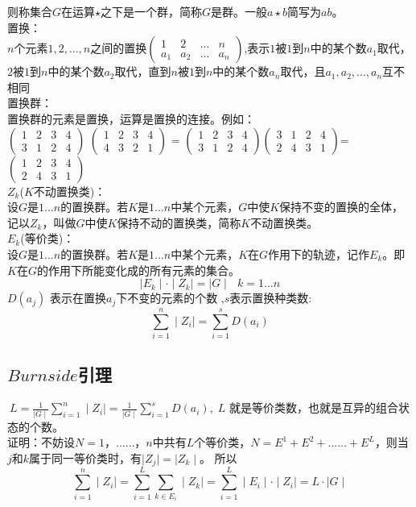 则称集合$G$在运算$\star$之下是一个群，简称$G$是群。一般$a\star b$简写为$ab$。\\
置换：\\
$n$个元素$1,2,...,n$之间的置换$\begin{pmatrix} 1 & 2 & ... & n \\ a_1 & a_2  & ... & a_n\end{pmatrix}$,表示$1$被$1$到$n$中的某个数$a_1$取代，$2$被$1$到$n$中的某个数$a_2$取代，直到$n$被$1$到$n$中的某个数$a_n$取代，且$a_1,a_2,…,a_n$互不相同 \\
置换群：\\
置换群的元素是置换，运算是置换的连接。例如： \\
$\begin{pmatrix} 1& 2 & 3 & 4 \\ 3 & 1  & 2 & 4\end{pmatrix}$ $\begin{pmatrix} 1& 2 & 3 & 4 \\ 4 & 3  & 2 & 1\end{pmatrix}$ = $\begin{pmatrix} 1& 2 & 3 & 4 \\ 3 & 1  & 2 & 4\end{pmatrix}$$\begin{pmatrix} 3& 1 & 2 & 4 \\ 2 & 4  & 3 & 1\end{pmatrix}$=$\begin{pmatrix} 1& 2 & 3 & 4 \\ 2 & 4  & 3 & 1\end{pmatrix}$ \\
$Z_k $($K$不动置换类)：\\
设$G$是$1…n$的置换群。若$K$是$1…n$中某个元素，$G$中使$K$保持不变的置换的全体，记以$Z_k$，叫做$G$中使$K$保持不动的置换类，简称$K$不动置换类。 \\
$E_k$(等价类)：\\
设$G$是$1…n$的置换群。若$K$是$1…n$中某个元素，$K$在$G$作用下的轨迹，记作$E_k$。即$K$在$G$的作用下所能变化成的所有元素的集合。 \\
$$\mid E_k\mid· \mid Z_k\mid=\mid G\mid   \ \ \  k=1…n$$
$ D(a_j)$ 表示在置换$a_j$下不变的元素的个数 ,$s$表示置换种类数: \\
$$\sum_{i=1}^{n}\mid Z_i \mid = \sum_{i=1}^{s}D(a_i)$$

\subsection{$Burnside$引理}
 $\ L= \frac{1}{\mid G \mid}\sum_{i=1}^{n}\mid Z_i \mid = \frac{1}{\mid G \mid}\sum_{i=1}^{s}D(a_i)$,$ \ \ L$ 就是等价类数，也就是互异的组合状态的个数。\\
证明：不妨设$N={1，……，n}$中共有$L$个等价类，$N=E^1+ E^2+……+E^L$，则当$j$和$k$属于同一等价类时，有$\mid Z_j \mid = \mid Z_k \mid$。 所以\\
$$\sum_{i=1}^{n}\mid Z_i \mid = \sum_{i=1}^{L} \sum_{k \in E_i} \mid Z_k \mid = \sum_{i=1}^{L}\mid E_i \mid \cdot \mid Z_i \mid =L \cdot \mid G \mid $$

